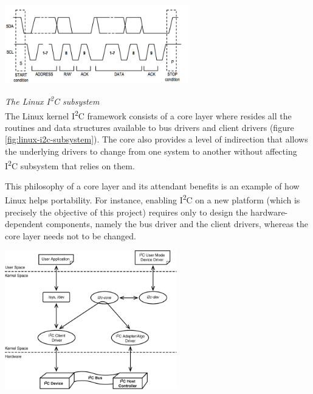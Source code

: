 \documentclass[a4paper,10pt]{article}
\makeatletter
\newenvironment{figurehere}{\def\@captype{figure}\vspace{2ex}}{\vspace{2ex}}
\newcommand{\icc}{I\textsuperscript{2}C }
\makeatother
\begin{document}
\begin{multicols}{2}
\begin{figurehere}
 \centering
 \includegraphics[width=8cm]{./figures/i2c-transaction.jpg}
 \caption{Sample \icc transaction (adapted from \emph{www.ermicro/blog}).}
 \label{fig:i2c-transaction}
\end{figurehere}

\emph{The Linux \icc subsystem}\\[6pt]
The Linux kernel \icc framework consists of a core layer where resides all the
routines and data structures available to bus drivers and client drivers
(figure \ref{fig:linux-i2c-subsystem}).
The core also provides a level of indirection that allows the underlying drivers
to change from one system to another without affecting \icc subsystem that
relies on them.

This philosophy of a core layer and its attendant benefits is an example of how
Linux helps portability. For instance, enabling \icc on a new platform (which is
precisely the objective of this project) requires only to design the
hardware-dependent components, namely the bus driver and the client drivers,
whereas the core layer needs not to be changed.

\begin{figurehere}
 \centering
 \includegraphics[width=7.5cm]{./figures/linux-i2c-subsystem.png}
 \caption{The Linux \icc subsystem (reprinted from \cite{venkateswaran2008eldd},
 		p. 236).}
 \label{fig:linux-i2c-subsystem}
\end{figurehere}




\end{multicols}
\end{document}
